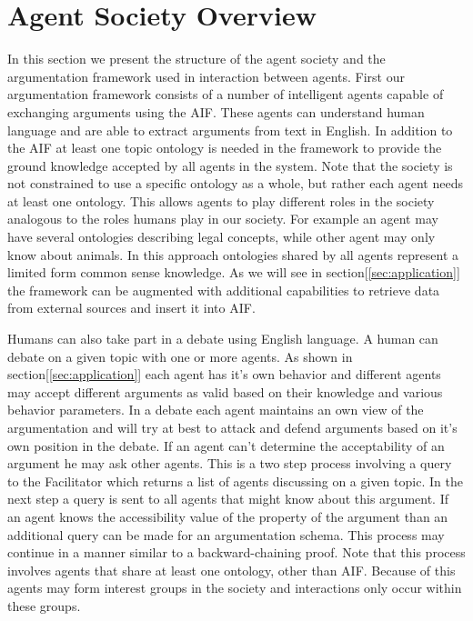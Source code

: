 \section{Agent Society Overview}
\label{sec:society}

In this section we present the structure of the agent society and the argumentation framework used in interaction between agents. First our argumentation framework consists of a number of intelligent agents capable of exchanging arguments using the AIF\cite{aif}. These agents can understand human language and are able to extract arguments from text in English. In addition to the AIF at least one topic ontology is needed in the framework to provide the ground knowledge accepted by all agents in the system. Note that the society is not constrained to use a specific ontology as a whole, but rather each agent needs at least one ontology. This allows agents to play different roles in the society analogous to the roles humans play in our society. For example an agent may have several ontologies describing legal concepts, while other agent may only know about animals. In this approach ontologies shared by all agents represent a limited form common sense knowledge. As we will see in section[\ref{sec:application}] the framework can be augmented with additional capabilities to retrieve data from external sources and insert it into AIF. 

Humans can also take part in a debate using English language. A human can debate on a given topic with one or more agents. As shown in section[\ref{sec:application}] each agent has it's own behavior and different agents may accept different arguments as valid based on their knowledge and various behavior parameters. In a debate each agent maintains an own view of the argumentation and will try at best to attack and defend arguments based on it's own position in the debate. If an agent can't determine the acceptability of an argument he may ask other agents. This is a two step process involving a query to the Facilitator  which returns a list of agents discussing on a given topic. In the next step a query is sent to all agents that might know about this argument. If an agent knows the accessibility value of the property of the argument than an additional query can be made for an argumentation schema. This process may continue in a manner similar to a backward-chaining proof. Note that this process involves agents that share at least one ontology, other than AIF. Because of this agents may form interest groups in the society and interactions only occur within these groups.

